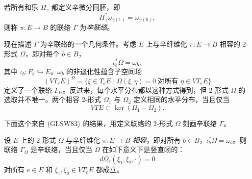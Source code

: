 \begin{definition}\label{def:symplectic-connection}
若所有和乐 $\Pi_\gamma$ 都定义辛微分同胚，即
\[
 \Pi_\gamma^*\omega_{\gamma(1)}=\omega_{\gamma(0)},
\]
则称 $\pi:E\to B$ 的联络 $\Gamma$ 为\emph{辛联络}。
\end{definition}

现在描述 $\Gamma$ 为辛联络的一个几何条件。考虑 $E$ 上与辛纤维化
$\pi:E\to B$ 相容的 $2$-形式 $\Omega$，即对每个 $b\in B$，
\[
 \iota_b^*\Omega=\omega_b,
\]
其中 $\iota_b:F_b\hookrightarrow E$。$\omega_b$ 的非退化性蕴含子空间场
\[
 (VT_eE)^\Omega
 =\{\xi\in T_eE\mid
      \Omega(\xi,\eta)=0\ \text{对所有 }\eta\in VT_eE\}
\]
定义了一个联络 $\Gamma_\Omega$。反过来，每个水平分布都以这种方式得到，但
$2$-形式 $\Omega$ 的选取并不唯一。两个相容 $2$-形式 $\Omega_1$ 与
$\Omega_2$ 定义相同的水平分布，当且仅当
\[
 VTE\subset\ker(\Omega_1-\Omega_2).
\]

下面这个来自 (GLSW83) 的结果，用定义联络的 $2$-形式 $\Omega$ 刻画辛联络
$\Gamma$。

\begin{proposition}\label{prop:symplectic-connection-vertical-closedness}
设 $E$ 上的 $2$-形式 $\Omega$ 与辛纤维化 $\pi:E\to B$ \emph{相容}，即对所有
$b\in B$，$\iota_b^*\Omega=\omega_b$。则联络 $\Gamma_\Omega$ 是辛联络，当且仅当 $\Omega$ 在如下意义下是竖直闭的：
\[
 d\Omega_e(\xi_1,\xi_2,\mathord\cdot)=0
\]
对所有 $e\in E$ 和 $\xi_1,\xi_2\in VT_eE$ 都成立。
\end{proposition}


